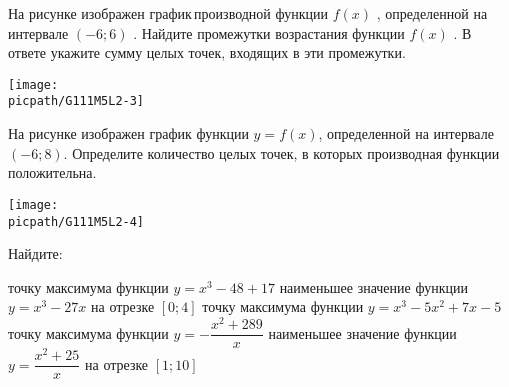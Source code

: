 \begin{class}[number=2]
\begin{listofex}
		\item
		\begin{minipage}[t]{\bodywidth}
			На рисунке изображен график производной функции \(f(x)\) , определенной на интервале \( (-6;6) \) . Найдите промежутки возрастания функции \(f(x)\) . В ответе укажите сумму целых точек, входящих в эти промежутки.
		\end{minipage}
		\hspace{0.02\linewidth}
		\begin{minipage}[t]{\picwidth}
			\texttt{[image: \\picpath/G111M5L2-3]}
		\end{minipage}
		\item
		\begin{minipage}[t]{\bodywidth}
			На рисунке изображен график функции \(y = f(x)\), определенной на интервале \((-6; 8)\). Определите количество целых точек, в которых производная функции положительна.
		\end{minipage}
		\hspace{0.02\linewidth}
		\begin{minipage}[t]{\picwidth}
			\texttt{[image: \\picpath/G111M5L2-4]}
		\end{minipage}
		\item Найдите:
		\begin{itasks}[1]
			\task точку максимума функции \(y = x^3 - 48 + 17\)
			\task наименьшее значение функции \(y = x^3 - 27x\) на отрезке \([0;4]\)
			\task точку максимума функции \(y = x^3 - 5x^2 + 7x -5\)
			\task точку максимума функции \(y = -\dfrac{x^2+289}{x}\)
			\task наименьшее значение функции \(y = \dfrac{x^2+25}{x}\) на отрезке \([1;10]\)
		\end{itasks}
	\end{listofex}
\end{class}

